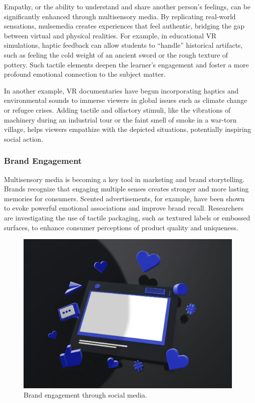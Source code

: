 \documentclass[
]{book}
\begin{document}
Empathy, or the ability to understand and share another person's feelings, can be significantly enhanced through multisensory media. By replicating real-world sensations, mulsemedia creates experiences that feel authentic, bridging the gap between virtual and physical realities. For example, in educational VR simulations, haptic feedback can allow students to ``handle'' historical artifacts, such as feeling the cold weight of an ancient sword or the rough texture of pottery. Such tactile elements deepen the learner's engagement and foster a more profound emotional connection to the subject matter.

In another example, VR documentaries have begun incorporating haptics and environmental sounds to immerse viewers in global issues such as climate change or refugee crises. Adding tactile and olfactory stimuli, like the vibrations of machinery during an industrial tour or the faint smell of smoke in a war-torn village, helps viewers empathize with the depicted situations, potentially inspiring social action.

\subsubsection*{Brand Engagement}\label{brand-engagement}

Multisensory media is becoming a key tool in marketing and brand storytelling. Brands recognize that engaging multiple senses creates stronger and more lasting memories for consumers. Scented advertisements, for example, have been shown to evoke powerful emotional associations and improve brand recall. Researchers are investigating the use of tactile packaging, such as textured labels or embossed surfaces, to enhance consumer perceptions of product quality and uniqueness.

\begin{figure}
\centering
\includegraphics[width=1\linewidth,height=\textheight,keepaspectratio]{images/engagement.jpg}
\caption{Brand engagement through social media.}
\end{figure}
\end{document}
